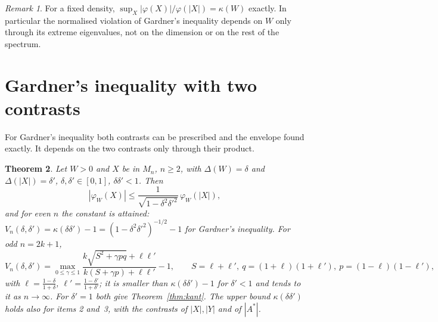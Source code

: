 \documentclass[11pt]{article}
\theoremstyle{plain}
\newtheorem{theorem}{Theorem}[section]
\theoremstyle{definition}
\theoremstyle{remark}
\newtheorem{remark}[theorem]{Remark}
\begin{document}
\begin{remark}
For a fixed density, $\sup_X|\varphi(X)|/\varphi(|X|)=\kappa(W)$ exactly. In particular the normalised violation of
Gardner's inequality depends on $W$ only through its extreme eigenvalues, not on the dimension or on the rest of the
spectrum.
\end{remark}

\section{Gardner's inequality with two contrasts}\label{sec:gardner2}

For Gardner's inequality both contrasts can be prescribed and the envelope found exactly. It depends on the two contrasts
only through their product.

\begin{theorem}\label{thm:gardnerD}
Let $W>0$ and $X$ be in $M_n$, $n\ge2$, with $\Delta(W)=\delta$ and $\Delta(|X|)=\delta'$, $\delta,\delta'\in[0,1]$,
$\delta\delta'<1$. Then
\[
  |\varphi_W(X)|\le\frac{1}{\sqrt{1-\delta^2\delta'^2}}\,\varphi_W(|X|),
\]
and for even $n$ the constant is attained: $V_n(\delta,\delta')=\kappa(\delta\delta')-1=(1-\delta^2\delta'^2)^{-1/2}-1$
for Gardner's inequality. For odd $n=2k+1$,
\[
  V_n(\delta,\delta')=\max_{0\le\gamma\le1}\frac{k\sqrt{S^2+\gamma pq}+\ell\ell'}{k(S+\gamma p)+\ell\ell'}-1,\qquad
  S=\ell+\ell',\ q=(1+\ell)(1+\ell'),\ p=(1-\ell)(1-\ell'),
\]
with $\ell=\frac{1-\delta}{1+\delta}$, $\ell'=\frac{1-\delta'}{1+\delta'}$; it is smaller than $\kappa(\delta\delta')-1$ for
$\delta'<1$ and tends to it as $n\to\infty$. For $\delta'=1$ both give Theorem~\ref{thm:kant}. The upper bound
$\kappa(\delta\delta')$ holds also for items 2 and~3, with the contrasts of $|X|,|Y|$ and of $|A^*|$.
\end{theorem}
\end{document}
